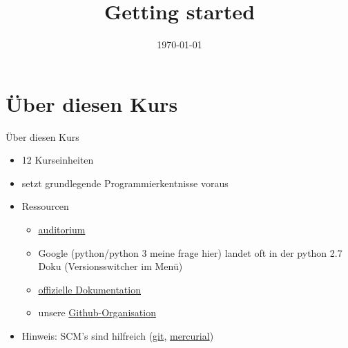 


\newcommand{\topic}{
	Getting started
}

\title{\topic}
\supertitle{\course}
\date{\today}



\maketitle

\begin{frame}
	\tableofcontents
\end{frame}


\section{Über diesen Kurs}
\begin{frame}{Über diesen Kurs}
	\begin{itemize}
    	\item 12 Kurseinheiten
    	\item setzt grundlegende Programmierkentnisse voraus
    	\item Ressourcen
    	\begin{itemize}
    	    \item \href{http://auditorium.inf.tu-dresden.de}{auditorium} %
	        \item Google (python/python 3 meine frage hier) landet oft in der python 2.7 Doku (Versionsswitcher im Menü)
    	    \item \href{docs.python.org}{offizielle Dokumentation}
    	    \item unsere \href{https://github.com/fsr}{Github-Organisation}
    	\end{itemize}
    	\item Hinweis: SCM's sind hilfreich (\href{https://git-scm.com}{git}, \href{http://mercurial.selenic.com/}{mercurial})
	\end{itemize}
\end{frame}

